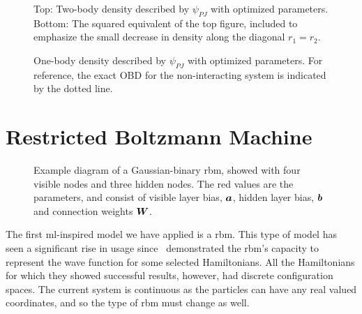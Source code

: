 \documentclass[Thesis.tex]{subfiles}
\begin{document}
\begin{figure}[h]
   \centering
    \resizebox{0.7\linewidth}{!}{%
        
    }
    \resizebox{0.7\linewidth}{!}{%
        
    }
    \caption[Two-body density using Pade-Jastrow wave function]{\label{fig:QD-benchmark-pade-jastrow-density}Top: Two-body density
      described by $\psi_{PJ}$ with optimized parameters. Bottom: The squared
      equivalent of the top figure, included to emphasize the small decrease in
      density along the diagonal $r_1=r_2$.}
\end{figure}

\begin{figure}[h]
   \centering
    \resizebox{0.7\linewidth}{!}{%
        
    }
    \caption[One-body density using Pade-Jastrow wave function]{\label{fig:QD-benchmark-pade-jastrow-onebody}One-body density
      described by $\psi_{PJ}$ with optimized parameters. For reference, the
      exact OBD for the non-interacting system is indicated by the dotted line.}
\end{figure}
\clearpage

\section{Restricted Boltzmann Machine}

\begin{figure}[h]
  \centering
  
  \caption[Illustration of a \acrfull{rbm}]{Example diagram of a Gaussian-binary \acrlong{rbm}, showed with four visible nodes
    and three hidden nodes. The red values are the parameters, and consist of
    visible layer bias, $\bm{a}$, hidden layer bias, $\bm{b}$ and connection
    weights $\bm{W}$.}
  \label{fig:rbm-diagram-example}
\end{figure}


The first \gls{ml}-inspired model we have applied is a \acrfull{rbm}.
This type of model has seen a significant rise in usage
since~\textcite{Carleo602} demonstrated the \gls{rbm}'s capacity to
represent the wave function for some selected Hamiltonians. All the
Hamiltonians for which they showed successful results, however, had discrete
configuration spaces. The current system is continuous as the particles can have
any real valued coordinates, and so the type of \gls{rbm} must change as well.
\end{document}
